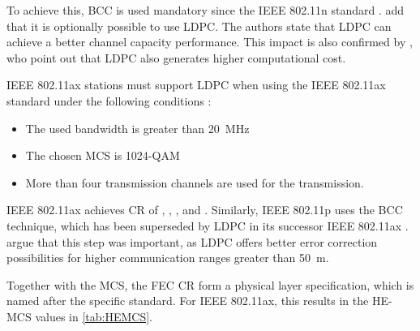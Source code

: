 To achieve this, \ac{BCC} is used mandatory since the IEEE 802.11n standard \cite{afaqui_ieee_2017,syafei_performance_2009}
. \textcite{syafei_performance_2009} add that it is optionally possible to
use \ac{LDPC}.
The authors state that \ac{LDPC} can achieve a better channel capacity performance.
This impact is also confirmed by \textcite{afaqui_ieee_2017}, who point out that \ac{LDPC} also generates higher computational cost.

IEEE 802.11ax stations must support \ac{LDPC} when using the IEEE 802.11ax standard under
the following conditions \cite{afaqui_ieee_2017,ieee_standard_2021ax} :
\begin{itemize}
   \item The used bandwidth is greater than \SI{20}{\mega\hertz}
   \item The chosen \ac{MCS} is \num{1024}-\ac{QAM}
   \item More than four transmission channels are used for the transmission.
\end{itemize}
IEEE 802.11ax achieves \ac{CR} of , , , and  \cite{ieee_standard_2021ax}.
Similarly, IEEE 802.11p uses the \ac{BCC} technique, which has been superseded by \ac{LDPC} in its successor
IEEE 802.11ax \cite{jacob_system-level_2020,krief_analysis_2020}.
\textcite{krief_analysis_2020} argue that this step was important, as \ac{LDPC} offers better error correction
possibilities for higher communication ranges greater than \SI{50}{\metre}.

Together with the \ac{MCS}, the \ac{FEC} \ac{CR} form a physical layer specification, which is named after the specific standard.
For IEEE 802.11ax, this results in the \ac{HE}-\ac{MCS} values in \autoref{tab:HEMCS}.


